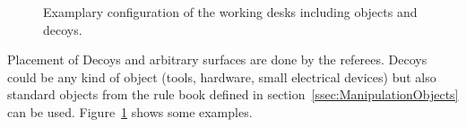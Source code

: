 \begin{figure}[h!]
	\begin{center}
		\hspace{.05\textwidth}
	\end{center}
	\caption{Examplary configuration of the working desks including objects and decoys.}
	\label{fig:ast_example}
\end{figure}

Placement of Decoys and arbitrary surfaces are done by the referees. Decoys could be any kind of object (tools, hardware, small electrical devices) but also standard objects from the rule book defined in section~\ref{ssec:ManipulationObjects} can be used. Figure~\ref{fig:ast_example} shows some examples. 



